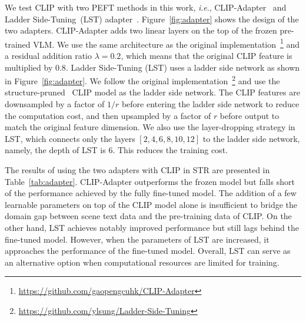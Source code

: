 \documentclass[lettersize,journal]{IEEEtran}
\newcommand{\ie}{\textit{i}.\textit{e}.}
\begin{document}
We test CLIP with two PEFT methods in this work, \ie,
CLIP-Adapter~\cite{2021_gao_clip_adapter} and Ladder Side-Tuning~(LST) adapter~\cite{2022_sung_lst}.
Figure~\ref{fig:adapter} shows the design of the two adapters.
CLIP-Adapter adds two linear layers on the top of the frozen pre-trained VLM.
We use the same architecture as the original implementation~\footnote{\url{https://github.com/gaopengcuhk/CLIP-Adapter}} and a residual addition ratio $\lambda=0.2$, which means that the original CLIP feature is multiplied by $0.8$.
Ladder Side-Tuning (LST) uses a ladder side network as shown in Figure~\ref{fig:adapter}.
We follow the original implementation~\footnote{\url{https://github.com/ylsung/Ladder-Side-Tuning}} and use the structure-pruned~\cite{2017_li_pruningfilters} CLIP model as the ladder side network.
The CLIP features are downsampled by a factor of $1/r$ before entering the ladder side network to reduce the computation cost, and then upsampled by a factor of $r$ before output to match the original feature dimension.
We also use the layer-dropping strategy in LST, which connects only the layers $[2,4,6,8,10,12]$ to the ladder side network, namely, the depth of LST is 6. This reduces the training cost.





The results of using the two adapters with CLIP in STR are presented in Table~\ref{tab:adapter}.
CLIP-Adapter outperforms the frozen model but falls short of the performance achieved by the fully fine-tuned model.
The addition of a few learnable parameters on top of the CLIP model alone is insufficient to bridge the domain gap between scene text data and the pre-training data of CLIP.
On the other hand, LST achieves notably improved performance but still lags behind the fine-tuned model.
However, when the parameters of LST are increased, it approaches the performance of the fine-tuned model.
Overall, LST can serve as an alternative option when computational resources are limited for training.
\end{document}
